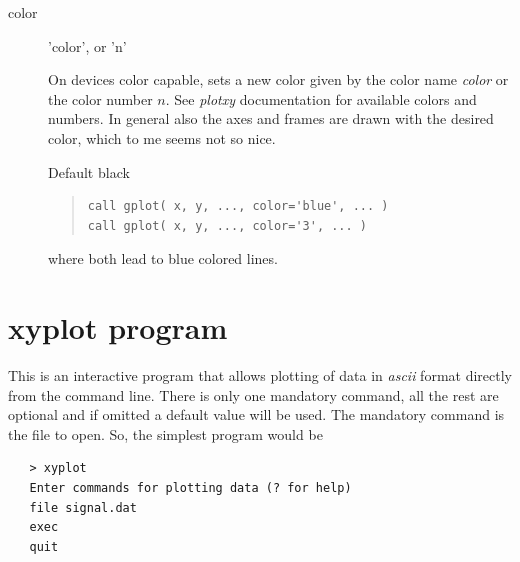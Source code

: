 \documentclass{article}
\begin{document}
\begin{description}
\item[color] 'color', or 'n'

On devices color capable, sets a new color given by the color name {\it color} or the color number $n$. See {\it plotxy} documentation for available colors and numbers. In general also the axes and frames are drawn with the desired color, which to me seems not so nice. 

Default black

\begin{quote}
\begin{verbatim}
call gplot( x, y, ..., color='blue', ... )
call gplot( x, y, ..., color='3', ... )
\end{verbatim}
\end{quote}
where both lead to blue colored lines. 
\end{description}

\section{xyplot program}
This is an interactive program that allows plotting of data in {\it ascii} format directly from the command line. There is only one mandatory command, all the rest are optional and if omitted a default value will be used. The mandatory command is the file to open. So, the simplest program would be
\begin{verbatim}
   > xyplot
   Enter commands for plotting data (? for help)
   file signal.dat
   exec
   quit
\end{verbatim}
\end{document}
